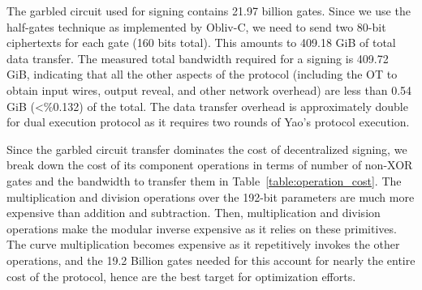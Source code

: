 
 The garbled circuit used for signing contains 21.97 billion gates. Since we use the half-gates technique as implemented by Obliv-C, we need to send two 80-bit ciphertexts for each gate (160 bits total). This amounts to 409.18 GiB of total data transfer. The measured total bandwidth required for a signing is 409.72 GiB, indicating that all the other aspects of the protocol (including the OT to obtain input wires, output reveal, and other network overhead) are less than 0.54 GiB (<\%0.132) of the total. The data transfer overhead is approximately double for dual execution protocol as it requires two rounds of Yao's protocol execution.

Since the garbled circuit transfer dominates the cost of decentralized signing, we break down the cost of its component operations in terms of number of non-XOR gates and the bandwidth to transfer them in Table~\ref{table:operation_cost}. The multiplication and division operations over the 192-bit parameters are much more expensive than addition and subtraction. Then, multiplication and division operations make the modular inverse expensive as it relies on these primitives. The curve multiplication becomes expensive as it repetitively invokes the other operations, and the 19.2 Billion gates needed for this account for nearly the entire cost of the protocol, hence are the best target for optimization efforts.

